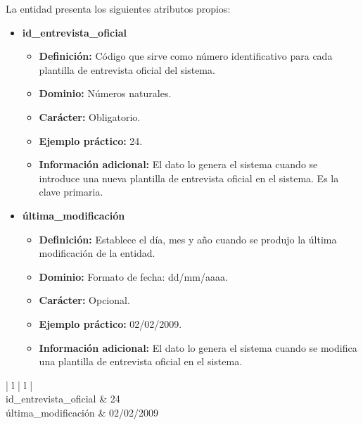 \begin{description}
   \item[Descripción de los atributos propios] La entidad presenta los
   siguientes atributos propios:

   \begin{itemize}
    \item \textbf{id\_entrevista\_oficial}
      \begin{itemize}
         \item \textbf{Definición:} Código que sirve como número identificativo
               para cada plantilla de entrevista oficial del sistema.
         \item \textbf{Dominio:} Números naturales.
         \item \textbf{Carácter:} Obligatorio.
         \item \textbf{Ejemplo práctico:} 24.
         \item \textbf{Información adicional:} El dato lo genera el sistema
               cuando se introduce una nueva plantilla de entrevista oficial en
               el sistema. Es la clave primaria.
      \end{itemize}
    \item \textbf{última\_modificación}
      \begin{itemize}
         \item \textbf{Definición:} Establece el día, mes y año cuando se
            produjo la última modificación de la entidad.
         \item \textbf{Dominio:} Formato de fecha: dd/mm/aaaa.
         \item \textbf{Carácter:} Opcional.
         \item \textbf{Ejemplo práctico:} 02/02/2009.
         \item \textbf{Información adicional:} El dato lo genera el sistema
               cuando se modifica una plantilla de entrevista oficial en
               el sistema.
      \end{itemize}
   \end{itemize}

   \item[Ejemplo práctico]

   \item \begin{center}
            \begin{tabular}{ | l | l | }
            \hline
             \\
            \hline
            id\_entrevista\_oficial & 24 \\
            \hline
            última\_modificación & 02/02/2009 \\
            \hline
            \end{tabular}
         \end{center}
   \end{description}
